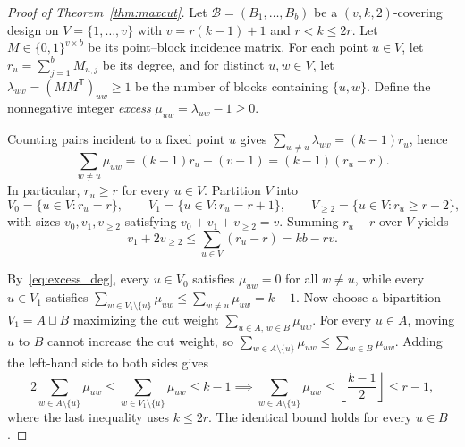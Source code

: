 \documentclass[11pt,a4paper]{article}
\theoremstyle{definition}
\theoremstyle{remark}
\begin{document}
\begin{proof}[Proof of Theorem~\ref{thm:maxcut}]
Let $\mathcal{B} = (B_1,\dots,B_b)$ be a $(v,k,2)$-covering design on $V = \{1,\dots,v\}$ with $v = r(k-1) + 1$ and $r < k \le 2r$. Let $M \in \{0,1\}^{v \times b}$ be its point--block incidence matrix. For each point $u \in V$, let $r_u = \sum_{j=1}^b M_{u,j}$ be its degree, and for distinct $u,w \in V$, let $\lambda_{uw} = (MM^\mathsf{T})_{uw} \ge 1$ be the number of blocks containing $\{u,w\}$. Define the nonnegative integer \emph{excess} $\mu_{uw} = \lambda_{uw} - 1 \ge 0$.

Counting pairs incident to a fixed point $u$ gives $\sum_{w \ne u} \lambda_{uw} = (k-1)r_u$, hence
\begin{equation}\label{eq:excess_deg}
  \sum_{w \ne u} \mu_{uw} = (k-1)r_u - (v-1) = (k-1)(r_u - r).
\end{equation}
In particular, $r_u \ge r$ for every $u \in V$. Partition $V$ into
\[
  V_0 = \{u \in V : r_u = r\}, \qquad V_1 = \{u \in V : r_u = r+1\}, \qquad V_{\ge 2} = \{u \in V : r_u \ge r+2\},
\]
with sizes $v_0, v_1, v_{\ge 2}$ satisfying $v_0 + v_1 + v_{\ge 2} = v$. Summing $r_u - r$ over $V$ yields
\begin{equation}\label{eq:deg_budget}
  v_1 + 2v_{\ge 2} \le \sum_{u \in V}(r_u - r) = kb - rv.
\end{equation}

By~\eqref{eq:excess_deg}, every $u \in V_0$ satisfies $\mu_{uw} = 0$ for all $w \ne u$, while every $u \in V_1$ satisfies $\sum_{w \in V_1 \setminus \{u\}} \mu_{uw} \le \sum_{w \ne u} \mu_{uw} = k - 1$. Now choose a bipartition $V_1 = A \sqcup B$ maximizing the cut weight $\sum_{u \in A,\, w \in B} \mu_{uw}$. For every $u \in A$, moving $u$ to $B$ cannot increase the cut weight, so $\sum_{w \in A \setminus \{u\}} \mu_{uw} \le \sum_{w \in B} \mu_{uw}$. Adding the left-hand side to both sides gives
\[
  2\sum_{w \in A \setminus \{u\}} \mu_{uw} \le \sum_{w \in V_1 \setminus \{u\}} \mu_{uw} \le k - 1 \implies \sum_{w \in A \setminus \{u\}} \mu_{uw} \le \left\lfloor \frac{k-1}{2} \right\rfloor \le r - 1,
\]
where the last inequality uses $k \le 2r$. The identical bound holds for every $u \in B$.


\end{proof}
\end{document}
